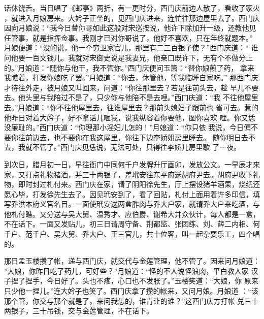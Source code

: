 话休饶舌。当日唱了《邮亭》两折，有一更时分，西门庆前边人散了，看收了家火
，就进入月娘房来。大妗子正坐的，见西门庆进来，连忙往那边屋里去了。西门庆
因向月娘说：“我今日替你哥如此这般对宋巡按说，他许下除加升一级，还教他见
任管事，就是指挥佥事。我刚才已对你哥说了，他好不喜欢，只在年终就题本。”
月娘便道：“没的说，他一个穷卫家官儿，那里有二三百银子使？”西门庆道：“
谁问他要一百文钱儿。我就对宋御史说是我妻兄，他亲口既许下，无有个不做分上
的。”月娘道：“随你与他干，我不管你。”西门庆便问玉箫：“替你娘煎了药，
拿来我瞧着，打发你娘吃了罢。”月娘道：“你去，休管他，等我临睡自家吃。”
那西门庆才待往外走，被月娘又叫回来，问道：“你往那里去？若是往前头去，趁
早儿不要去。他头里与我陪过不是了，只少你与他陪不是去哩。”西门庆道：“我
不往他屋里去。”月娘道：“你不往他屋里去，往谁屋里去？那前头媳妇子跟前也
省可去。惹的他昨日对着大妗子，好不拿话儿咂我，说我纵容着你要他，图你喜欢
哩。你又恁没廉耻的。”西门庆道：“你理那小淫妇儿怎的！”月娘道：“你只依
我说，今日偏不要你往前边去，也不要你在我这屋里，你往下边李娇姐房里睡去。
随你明日去不去，我就不管了。”西门庆见恁说，无法可处，只得往李娇儿房里歇
了一夜。

到次日，腊月初一日，早往衙门中同何千户发牌升厅画卯，发放公文。一早辰才来
家，又打点礼物猪酒，并三十两银子，差玳安往东平府送胡府尹去。胡府尹收下礼
物，即时封过札付来。西门庆在家，请了阴阳徐先生，厅上摆设猪羊酒果，烧纸还
愿心毕，打发徐先生去了。因见玳安到了，看了回贴，札付上面用着许多印信，填
写乔洪本府义官名目。一面使玳安送两盒胙肉与乔大户家，就请乔大户来吃酒，与
他札付瞧。又分送与吴大舅、温秀才、应伯爵、谢希大并众伙计，每人都是一盒，
不在话下。一面又发贴儿，初三日请周守备、荆都监、张团练、刘、薛二内相、何
千户、范千户、吴大舅、乔大户、王三官儿，共十位客，叫一起杂耍乐工，四个唱
的。

那日孟玉楼攒了帐，递与西门庆，就交代与金莲管理，他不管了。因来问月娘道：
”大娘，你昨日吃了药儿，可好些？”月娘道：“怪的不人说怪浪肉，平白教人家
汉子捏了捏手，今日好了。头也不疼，心口也不发胀了。”玉楼笑道：“大娘，你
原来只少他一捏儿。”连大妗子也笑了。西门庆拿了攒的帐来，又问月娘。月娘道
：“该那个管，你交与那个就是了。来问我怎的，谁肯让的谁？”这西门庆方打帐
兑三十两银子，三十吊钱，交与金莲管理，不在话下。

